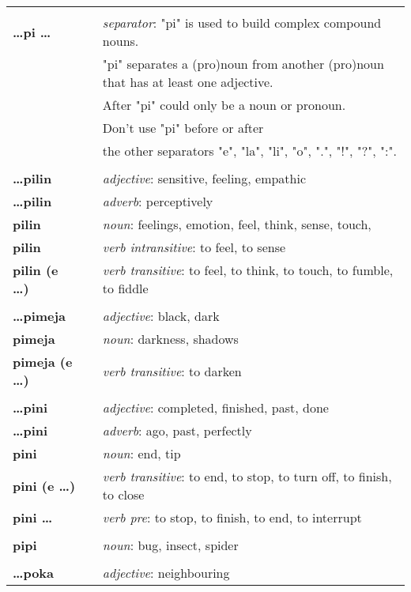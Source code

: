 \begin{supertabular}{p{2,5cm}|ll}
 && \\ %
\textbf{\dots pi \dots } && \textit{separator}: "pi" is used to build complex compound nouns. \\ && "pi" separates a (pro)noun from another (pro)noun that has at least one adjective. \\ && After "pi" could only be a noun or pronoun. \\ && Don't use "pi" before or after \\ && the other separators "e", "la", "li", "o", ".", "!", "?", ":".  \\ 
 && \\ %
\textbf{\dots pilin} && \textit{adjective}: sensitive, feeling, empathic \\ 
\textbf{\dots pilin} && \textit{adverb}: perceptively \\ 
\textbf{pilin} && \textit{noun}: feelings, emotion, feel, think, sense, touch, \\ 
\textbf{pilin} && \textit{verb intransitive}: to feel, to sense \\ 
\textbf{pilin (e \dots)} && \textit{verb transitive}: to feel, to think, to touch, to fumble, to fiddle \\ 
 && \\ %
\textbf{\dots pimeja} && \textit{adjective}: black, dark \\ 
\textbf{pimeja} && \textit{noun}: darkness, shadows \\ 
\textbf{pimeja (e \dots)} && \textit{verb transitive}: to darken \\ 
 && \\ %
\textbf{\dots pini} && \textit{adjective}: completed, finished, past, done \\ 
\textbf{\dots pini} && \textit{adverb}: ago, past, perfectly \\ 
\textbf{pini} && \textit{noun}: end, tip \\ 
\textbf{pini (e \dots)} && \textit{verb transitive}: to end, to stop, to turn off, to finish, to close \\ 
\textbf{pini \dots } && \textit{verb pre}: to stop, to finish, to end, to interrupt \\ 
 && \\ %
\textbf{pipi} && \textit{noun}: bug, insect, spider \\ 
 && \\ %
\textbf{\dots poka} && \textit{adjective}: neighbouring \\ 

\end{supertabular}
